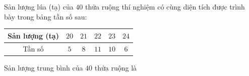 \begin{ex}
Sản lượng lúa (tạ) của $40$ thửa ruộng thí nghiệm có cùng diện tích được trình bày trong bảng tần số sau:
\begin{center}
\begin{tabular}{|c|c|c|c|c|c|}\hline
Sản lượng (tạ) & $20$ & $21$ & $22$ & $23$ & $24$\\\hline
Tần số & $5$ & $8$ & $11$ & $10$ & $6$\\\hline
\end{tabular}
\end{center}
Sản lượng trung bình của $40$ thửa ruộng là
\end{ex}

